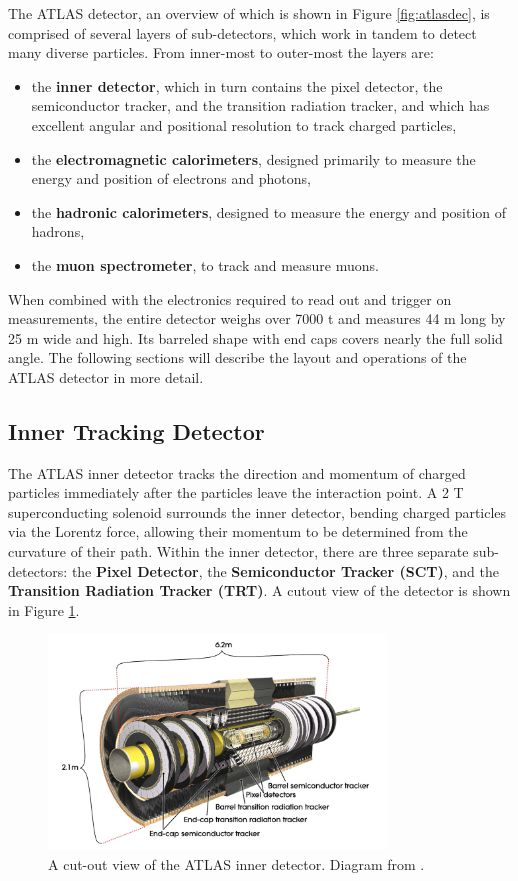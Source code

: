 The ATLAS detector, an overview of which is shown in Figure \ref{fig:atlasdec}, is comprised of several layers of sub-detectors, which work in tandem to detect many diverse particles. From inner-most to outer-most the layers are:

\begin{itemize}
    \item the \textbf{inner detector}, which in turn contains the pixel detector, the semiconductor tracker, and the transition radiation tracker, and which has excellent angular and positional resolution to track charged particles,
    \item the \textbf{electromagnetic calorimeters}, designed primarily to measure the energy and position of electrons and photons,
    \item the \textbf{hadronic calorimeters}, designed to measure the energy and position of hadrons,
    \item the \textbf{muon spectrometer}, to track and measure muons.
\end{itemize}

When combined with the electronics required to read out and trigger on measurements, the entire detector weighs over 7000 t and measures 44 m long by 25 m wide and high. Its barreled shape with end caps covers nearly the full solid angle. The following sections will describe the layout and operations of the ATLAS detector in more detail.

\subsection{Inner Tracking Detector}
The ATLAS inner detector tracks the direction and momentum of charged particles immediately after the particles leave the interaction point. A 2 T superconducting solenoid surrounds the inner detector, bending charged particles via the Lorentz force, allowing their momentum to be determined from the curvature of their path. Within the inner detector, there are three separate sub-detectors: the \textbf{Pixel Detector}, the \textbf{Semiconductor Tracker (SCT)}, and the \textbf{Transition Radiation Tracker (TRT)}. A cutout view of the detector is shown in Figure \ref{fig:atlasinner}.

\begin{figure}[H]
    \centering
    \includegraphics[width=0.8\textwidth]{Figures/2/InnerDetector.png}
    \caption{A cut-out view of the ATLAS inner detector. Diagram from \cite{ATLASDesign}.}
    \label{fig:atlasinner}
\end{figure}

